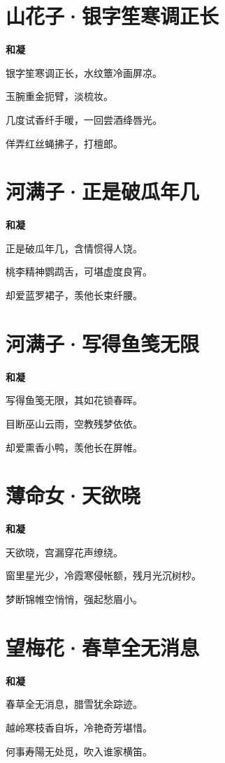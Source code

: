 \documentclass[12pt,a4paper]{ctexbook}
\begin{document}
\section{山花子·银字笙寒调正长}
\textbf{和凝}\par\vspace{0.5em}
银字笙寒调正长，水纹簟冷画屏凉。\par
玉腕重金扼臂，淡梳妆。\par
几度试香纤手暖，一回尝酒绛唇光。\par
佯弄红丝蝇拂子，打檀郎。\par

\section{河满子·正是破瓜年几}
\textbf{和凝}\par\vspace{0.5em}
正是破瓜年几，含情惯得人饶。\par
桃李精神鹦鹉舌，可堪虚度良宵。\par
却爱蓝罗裙子，羡他长束纤腰。\par

\section{河满子·写得鱼笺无限}
\textbf{和凝}\par\vspace{0.5em}
写得鱼笺无限，其如花锁春晖。\par
目断巫山云雨，空教残梦依依。\par
却爱熏香小鸭，羡他长在屏帷。\par

\section{薄命女·天欲晓}
\textbf{和凝}\par\vspace{0.5em}
天欲晓，宫漏穿花声缭绕。\par
窗里星光少，冷霞寒侵帐额，残月光沉树杪。\par
梦断锦帷空悄悄，强起愁眉小。\par

\section{望梅花·春草全无消息}
\textbf{和凝}\par\vspace{0.5em}
春草全无消息，腊雪犹余踪迹。\par
越岭寒枝香自坼，冷艳奇芳堪惜。\par
何事寿陽无处觅，吹入谁家横笛。\par
\end{document}
